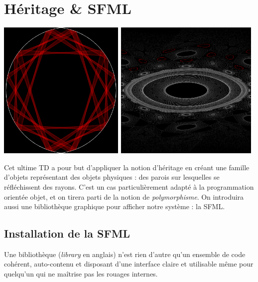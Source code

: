 \documentclass{book}
\begin{document}
\setcounter{chapter}{4}

\chapter{Héritage \& SFML}

\begin{center}
  \includegraphics[height=18em]{TD5bis/exemple-billard.png}
  \hspace{3em}
  \includegraphics[height=18em]{TD5bis/exemple-espace-des-phases.png}
\end{center}

Cet ultime TD a pour but d'appliquer la notion d'héritage en créant une famille d'objets représentant des objets physiques : des parois sur lesquelles se réfléchissent des rayons. C'est un cas particulièrement adapté à la programmation orientée objet, et on tirera parti de la notion de \emph{polymorphisme}. On introduira aussi une bibliothèque graphique pour afficher notre système : la SFML.

\section{Installation de la SFML}

Une bibliothèque (\emph{library} en anglais) n'est rien d'autre qu'un ensemble de code cohérent, auto-contenu et disposant d'une interface claire et utilisable même pour quelqu'un qui ne maîtrise pas les rouages internes.\\
\end{document}
